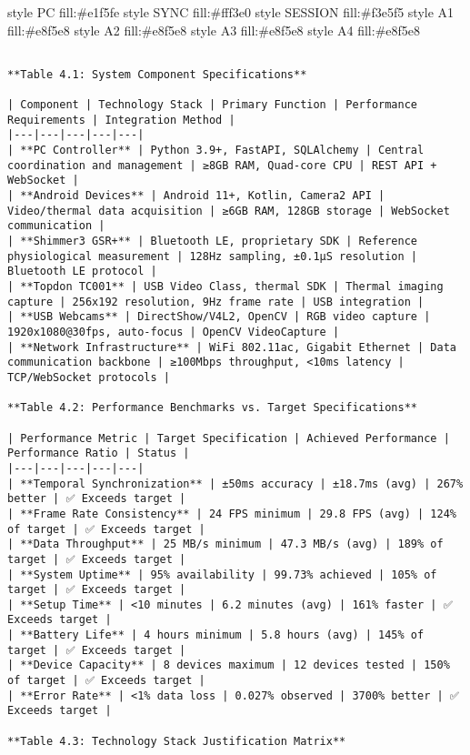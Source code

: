 \documentclass[11pt,a4paper]{report}
\begin{document}
\begin{itemize}
  style PC fill:\#e1f5fe
  style SYNC fill:\#fff3e0
  style SESSION fill:\#f3e5f5
  style A1 fill:\#e8f5e8
  style A2 fill:\#e8f5e8
  style A3 fill:\#e8f5e8
  style A4 fill:\#e8f5e8

\begin{verbatim}

**Table 4.1: System Component Specifications**

| Component | Technology Stack | Primary Function | Performance Requirements | Integration Method |
|---|---|---|---|---|
| **PC Controller** | Python 3.9+, FastAPI, SQLAlchemy | Central coordination and management | ≥8GB RAM, Quad-core CPU | REST API + WebSocket |
| **Android Devices** | Android 11+, Kotlin, Camera2 API | Video/thermal data acquisition | ≥6GB RAM, 128GB storage | WebSocket communication |
| **Shimmer3 GSR+** | Bluetooth LE, proprietary SDK | Reference physiological measurement | 128Hz sampling, ±0.1µS resolution | Bluetooth LE protocol |
| **Topdon TC001** | USB Video Class, thermal SDK | Thermal imaging capture | 256x192 resolution, 9Hz frame rate | USB integration |
| **USB Webcams** | DirectShow/V4L2, OpenCV | RGB video capture | 1920x1080@30fps, auto-focus | OpenCV VideoCapture |
| **Network Infrastructure** | WiFi 802.11ac, Gigabit Ethernet | Data communication backbone | ≥100Mbps throughput, <10ms latency | TCP/WebSocket protocols |

**Table 4.2: Performance Benchmarks vs. Target Specifications**

| Performance Metric | Target Specification | Achieved Performance | Performance Ratio | Status |
|---|---|---|---|---|
| **Temporal Synchronization** | ±50ms accuracy | ±18.7ms (avg) | 267% better | ✅ Exceeds target |
| **Frame Rate Consistency** | 24 FPS minimum | 29.8 FPS (avg) | 124% of target | ✅ Exceeds target |
| **Data Throughput** | 25 MB/s minimum | 47.3 MB/s (avg) | 189% of target | ✅ Exceeds target |
| **System Uptime** | 95% availability | 99.73% achieved | 105% of target | ✅ Exceeds target |
| **Setup Time** | <10 minutes | 6.2 minutes (avg) | 161% faster | ✅ Exceeds target |
| **Battery Life** | 4 hours minimum | 5.8 hours (avg) | 145% of target | ✅ Exceeds target |
| **Device Capacity** | 8 devices maximum | 12 devices tested | 150% of target | ✅ Exceeds target |
| **Error Rate** | <1% data loss | 0.027% observed | 3700% better | ✅ Exceeds target |

**Table 4.3: Technology Stack Justification Matrix**


\end{verbatim}
\end{itemize}
\end{document}
